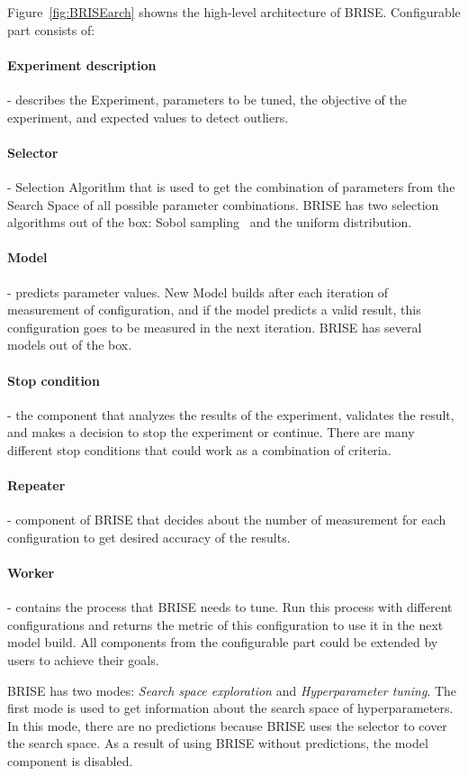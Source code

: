 Figure~\ref{fig:BRISEarch} showns the high-level architecture of BRISE.
Configurable part consists of:
\paragraph{Experiment description} - describes the Experiment, parameters to be tuned, the objective of the experiment, and expected values to detect outliers.
\paragraph{Selector} - Selection Algorithm that is used to get the combination of parameters from the Search Space of all possible parameter combinations. BRISE has two selection algorithms out of the box: Sobol sampling~\cite{sobol99} and the uniform distribution. 
\paragraph{Model} - predicts parameter values. New Model builds after each iteration of measurement of configuration, and if the model predicts a valid result, this configuration goes to be measured in the next iteration. BRISE has several models out of the box.
\paragraph{Stop condition} - the component that analyzes the results of the experiment, validates the result, and makes a decision to stop the experiment or continue. There are many different stop conditions that could work as a combination of criteria.
\paragraph{Repeater} - component of BRISE that decides about the number of measurement for each configuration to get desired accuracy of the results. 
\paragraph{Worker} - contains the process that BRISE needs to tune. Run this process with different configurations and returns the metric of this configuration to use it in the next model build.
All components from the configurable part could be extended by users to achieve their goals.

BRISE has two modes: \textit{Search space exploration} and \textit{Hyperparameter tuning}.
The first mode is used to get information about the search space of hyperparameters. In this mode, there are no predictions because BRISE uses the selector to cover the search space. As a result of using BRISE without predictions, the model component is disabled.

